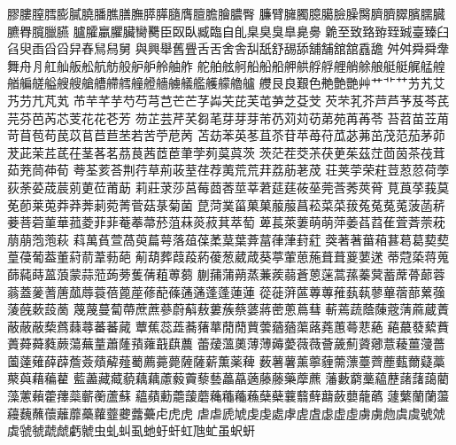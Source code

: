 膠󠄀膢󠄀膣󠄀膤󠄀膨󠄀膩󠄀膮󠄀膰󠄀膲󠄀膳󠄀膴󠄀膵󠄀膵󠄁膸󠄀膺󠄀膻󠄀膽󠄀膾󠄀膿󠄀臀󠄀
臁󠄀臂󠄀臃󠄀臅󠄀臆󠄀臈󠄀臉󠄀臊󠄀臋󠄀臍󠄀臍󠄁臎󠄀臏󠄀臑󠄀臓󠄀臕󠄀臖󠄀臗󠄀臘󠄀臙󠄀
臚󠄀臛󠄀臝󠄀臞󠄀臟󠄀臠󠄀臡󠄀臣󠄀臤󠄀臥󠄀臧󠄀臨󠄀自󠄀臫󠄀臬󠄀臭󠄀臭󠄁臯󠄀臰󠄀臱󠄀
臲󠄀至󠄀致󠄀臵󠄀臶󠄀臸󠄀臹󠄀臺󠄀臻󠄀臼󠄀臽󠄀臾󠄀臿󠄀舀󠄀舀󠄁舁󠄀舂󠄀舃󠄀舄󠄀舅󠄀
與󠄀興󠄀舉󠄀舊󠄀舋󠄀舌󠄀舌󠄁舍󠄀舎󠄀舏󠄀舐󠄀舒󠄀舓󠄀舔󠄀舖󠄀舗󠄀舘󠄀舘󠄁舙󠄀舚󠄀
舛󠄀舛󠄁舜󠄀舜󠄁舝󠄀舞󠄀舟󠄀舟󠄁舡󠄀舢󠄀舨󠄀舩󠄀航󠄀舫󠄀般󠄀舮󠄀舮󠄁舲󠄀舳󠄀舴󠄀
舵󠄀舶󠄀舷󠄀舸󠄀船󠄀船󠄁船󠄂舺󠄀舼󠄀艀󠄀艀󠄁艃󠄀艄󠄀艅󠄀艆󠄀艇󠄀艇󠄁艉󠄀艋󠄀艎󠄀
艏󠄀艑󠄀艖󠄀艗󠄀艘󠄀艘󠄁艙󠄀艚󠄀艜󠄀艝󠄀艟󠄀艠󠄀艢󠄀艣󠄀艤󠄀艦󠄀艧󠄀艨󠄀艪󠄀艫󠄀
艭󠄀艮󠄀良󠄀艱󠄀色󠄀艴󠄀艶󠄀艷󠄀艸󠄀艹󠄀艹󠄁艹󠄂艻󠄀艽󠄀艾󠄀艿󠄀芀󠄀芁󠄀芃󠄀芄󠄀
芇󠄀芉󠄀芊󠄀芋󠄀芍󠄀芍󠄁芎󠄀芑󠄀芒󠄀芒󠄁芓󠄀芔󠄀芖󠄀芘󠄀芙󠄀芚󠄀芛󠄀芝󠄀芟󠄀芠󠄀
芡󠄀芣󠄀芤󠄀芥󠄀芦󠄀芦󠄁芧󠄀芨󠄀芩󠄀芪󠄀芫󠄀芬󠄀芭󠄀芮󠄀芯󠄀芰󠄀花󠄀花󠄁芲󠄀芳󠄀
芴󠄀芷󠄀芸󠄀芹󠄀芺󠄀芻󠄀芼󠄀芽󠄀芽󠄁芽󠄂芾󠄀芿󠄀苅󠄀苅󠄁苆󠄀苐󠄀苑󠄀苒󠄀苒󠄁苓󠄀
苔󠄀苕󠄀苗󠄀苙󠄀苚󠄀苛󠄀苜󠄀苞󠄀苟󠄀苠󠄀苡󠄀苢󠄀苣󠄀苣󠄁苤󠄀若󠄀苦󠄀苧󠄀苨󠄀苪󠄀
苫󠄀苭󠄀苯󠄀英󠄀苳󠄀苴󠄀苶󠄀苷󠄀苹󠄀苺󠄀苻󠄀苽󠄀苾󠄀茀󠄀茁󠄀茂󠄀范󠄀茄󠄀茅󠄀茆󠄀
茇󠄀茈󠄀茉󠄀茊󠄀茋󠄀茌󠄀茎󠄀茖󠄀茗󠄀茘󠄀茛󠄀茜󠄀茝󠄀茞󠄀茟󠄀茡󠄀茢󠄀茣󠄀茣󠄁茨󠄀
茨󠄁茫󠄀茬󠄀茭󠄀茮󠄀茯󠄀茰󠄀茱󠄀茲󠄀茳󠄀茴󠄀茵󠄀茶󠄀茷󠄀茸󠄀茹󠄀茺󠄀茼󠄀茽󠄀荀󠄀
荂󠄀荃󠄀荄󠄀荅󠄀荆󠄀荇󠄀草󠄀荊󠄀荍󠄀荎󠄀荏󠄀荐󠄀荑󠄀荒󠄀荒󠄁荓󠄀荔󠄀荕󠄀荖󠄀荗󠄀
荘󠄀荚󠄀荢󠄀荣󠄀荰󠄀荳󠄀荵󠄀荵󠄁荷󠄀荸󠄀荻󠄀荼󠄀荽󠄀荿󠄀莀󠄀莂󠄀莄󠄀莅󠄀莆󠄀莇󠄀
莉󠄀莊󠄀莍󠄀莎󠄀莒󠄀莓󠄀莔󠄀莕󠄀莖󠄀莘󠄀莙󠄀莚󠄀莛󠄀莜󠄀莝󠄀莞󠄀莟󠄀莠󠄀莢󠄀莦󠄀
莧󠄀莨󠄀莩󠄀莪󠄀莫󠄀莬󠄀莭󠄀莱󠄀莵󠄀莽󠄀莽󠄁莾󠄀莿󠄀菀󠄀菁󠄀菅󠄀菇󠄀菉󠄀菊󠄀菌󠄀
菎󠄀菏󠄀菐󠄀菑󠄀菓󠄀菓󠄁菔󠄀菔󠄁菖󠄀菘󠄀菜󠄀菜󠄁菝󠄀菟󠄀菟󠄁菟󠄂菟󠄃菠󠄀菡󠄀菥󠄀
菨󠄀菩󠄀菪󠄀菫󠄀華󠄀菰󠄀菱󠄀菲󠄀菲󠄁菴󠄀菶󠄀菷󠄀菸󠄀菹󠄀菻󠄀菼󠄀菽󠄀萁󠄀萃󠄀萄󠄀
萆󠄀萇󠄀萊󠄀萋󠄀萌󠄀萌󠄁萍󠄀萎󠄀萏󠄀萏󠄁萑󠄀萓󠄀萕󠄀萗󠄀萙󠄀萠󠄀萠󠄁萢󠄀萢󠄁萩󠄀
萪󠄀萬󠄀萯󠄀萱󠄀萵󠄀萸󠄀萹󠄀萼󠄀落󠄀葅󠄀葆󠄀葇󠄀葈󠄀葉󠄀葊󠄀葍󠄀葎󠄀葏󠄀葑󠄀葒󠄀
葖󠄀著󠄀著󠄁葘󠄀葙󠄀葚󠄀葛󠄀葛󠄁葜󠄀葜󠄁葟󠄀葠󠄀葡󠄀葢󠄀董󠄀葤󠄀葥󠄀葦󠄀葧󠄀葩󠄀
葪󠄀葫󠄀葬󠄀葭󠄀葮󠄀葯󠄀葰󠄀葱󠄀葳󠄀葴󠄀葵󠄀葶󠄀葷󠄀葸󠄀葹󠄀葺󠄀葺󠄁葼󠄀葽󠄀蒁󠄀
蒂󠄀蒄󠄀蒅󠄀蒋󠄀蒐󠄀蒒󠄀蒓󠄀蒔󠄀蒕󠄀蒗󠄀蒙󠄀蒜󠄀蒞󠄀蒟󠄀蒡󠄀蒦󠄀蒨󠄀蒩󠄀蒪󠄀蒭󠄀
蒯󠄀蒱󠄀蒲󠄀蒴󠄀蒸󠄀蒹󠄀蒺󠄀蒻󠄀蒼󠄀蒽󠄀蒾󠄀蒿󠄀蓀󠄀蓁󠄀蓂󠄀蓄󠄀蓆󠄀蓇󠄀蓈󠄀蓉󠄀
蓊󠄀蓋󠄀蓌󠄀蓍󠄀蓎󠄀蓏󠄀蓐󠄀蓑󠄀蓓󠄀蓖󠄀蓙󠄀蓚󠄀蓜󠄀蓧󠄀蓪󠄀蓪󠄁蓬󠄀蓬󠄁蓮󠄀蓮󠄁
蓯󠄀蓰󠄀蓱󠄀蓲󠄀蓴󠄀蓴󠄁蓷󠄀蓺󠄀蓻󠄀蓼󠄀蓽󠄀蓿󠄀蔀󠄀蔂󠄀蔃󠄀蔆󠄀蔇󠄀蔌󠄀蔎󠄀蔐󠄀
蔑󠄀蔑󠄁蔓󠄀蔔󠄀蔕󠄀蔗󠄀蔗󠄁蔘󠄀蔚󠄀蔛󠄀蔜󠄀蔞󠄀蔟󠄀蔡󠄀蔢󠄀蔣󠄀蔤󠄀蔥󠄀蔦󠄀蔧󠄀
蔪󠄀蔫󠄀蔬󠄀蔭󠄀蔯󠄀蔲󠄀蔳󠄀蔴󠄀蔵󠄀蔶󠄀蔽󠄀蔽󠄁蔽󠄂蔾󠄀蔿󠄀蕀󠄀蕁󠄀蕃󠄀蕃󠄁蕆󠄀
蕈󠄀蕉󠄀蕊󠄀蕋󠄀蕎󠄀蕏󠄀蕐󠄀蕑󠄀蕑󠄁蕒󠄀蕓󠄀蕕󠄀蕕󠄁蕖󠄀蕗󠄀蕘󠄀蕙󠄀蕚󠄀蕜󠄀蕝󠄀
蕝󠄁蕞󠄀蕟󠄀蕠󠄀蕡󠄀蕢󠄀蕣󠄀蕣󠄁蕤󠄀蕨󠄀蕩󠄀蕪󠄀蕫󠄀蕭󠄀蕯󠄀蕷󠄀蕹󠄀蕺󠄀蕻󠄀蕽󠄀
蕾󠄀蕿󠄀薀󠄀薁󠄀薄󠄀薄󠄁薅󠄀薆󠄀薇󠄀薇󠄁薈󠄀薉󠄀薊󠄀薋󠄀薌󠄀薏󠄀薐󠄀薑󠄀薓󠄀薔󠄀
薗󠄀薘󠄀薙󠄀薛󠄀薜󠄀薝󠄀薟󠄀薠󠄀薢󠄀薤󠄀薥󠄀薦󠄀薧󠄀薨󠄀薩󠄀薩󠄁薪󠄀薫󠄀薬󠄀薭󠄀
薮󠄀薯󠄀薯󠄁薰󠄀薴󠄀薶󠄀薷󠄀薸󠄀薹󠄀薺󠄀薼󠄀薽󠄀薾󠄀薿󠄀藁󠄀藂󠄀藇󠄀藉󠄀藊󠄀藋󠄀
藍󠄀藎󠄀藏󠄀藏󠄁藐󠄀藕󠄀藕󠄁藘󠄀藙󠄀藚󠄀藜󠄀藝󠄀藟󠄀藠󠄀藡󠄀藤󠄀藤󠄁藥󠄀藦󠄀藨󠄀
藩󠄀藪󠄀藭󠄀藳󠄀藴󠄀藶󠄀藷󠄀藷󠄁藹󠄀藺󠄀藻󠄀藼󠄀藾󠄀藿󠄀蘀󠄀蘂󠄀蘄󠄀蘅󠄀蘆󠄀蘇󠄀
蘊󠄀蘋󠄀蘍󠄀蘎󠄀蘐󠄀蘑󠄀蘒󠄀蘒󠄁蘒󠄂蘓󠄀蘖󠄀蘗󠄀蘘󠄀蘙󠄀蘚󠄀蘛󠄀蘞󠄀蘡󠄀蘢󠄀蘤󠄀
蘧󠄀蘩󠄀蘭󠄀蘭󠄁蘯󠄀蘰󠄀蘶󠄀蘸󠄀蘹󠄀蘺󠄀蘼󠄀蘽󠄀蘿󠄀虀󠄀虁󠄀虂󠄀虆󠄀虍󠄀虎󠄀虎󠄁
虐󠄀虐󠄁虒󠄀虓󠄀虔󠄀虔󠄁處󠄀虖󠄀虗󠄀虘󠄀虙󠄀虚󠄀虛󠄀虜󠄀虜󠄁虝󠄀虞󠄀虞󠄁號󠄀虠󠄀
虡󠄀虢󠄀虢󠄁虣󠄀虤󠄀虧󠄀虩󠄀虫󠄀虬󠄀虯󠄀虱󠄀虵󠄀虶󠄀虷󠄀虹󠄀虺󠄀虻󠄀虽󠄀蚇󠄀蚈󠄀
